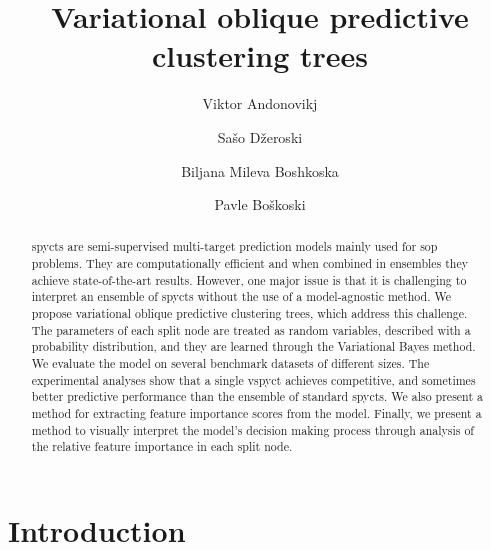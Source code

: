 \documentclass[3p,review,authoryear]{elsarticle}
\begin{document}
\begin{frontmatter}
	\title{Variational oblique predictive clustering trees}
	\author[1,2]{Viktor Andonovikj}
	\author[1]{Sašo Džeroski}
	\author[1,3]{Biljana Mileva Boshkoska}
	\author[1,3]{Pavle Boškoski}
	\address[1]{Jožef Stefan Institute, Jamova cesta 39, 1000 Ljubljana, Slovenia}
	\address[2]{Jožef Stefan International Postgraduate School, Jamova cesta 39, 1000 Ljubljana, Slovenia}
	\address[3]{Faculty of Information Studies in Novo mesto, Ljubljanska cesta 31b, 8000 Novo mesto, Slovenia}
\begin{abstract}

\Glspl{spyct} are semi-supervised multi-target prediction models mainly used for \gls{sop} problems.
They are computationally efficient and when combined in ensembles they achieve state-of-the-art results.
However, one major issue is that it is challenging to interpret an ensemble of \glspl{spyct} without the use of a model-agnostic method.
We propose variational oblique predictive clustering trees, which address this challenge.
The parameters of each split node are treated as random variables, described with a probability distribution, and they are learned through the Variational Bayes method.
We evaluate the model on several benchmark datasets of different sizes.
The experimental analyses show that a single \gls{vspyct} achieves competitive, and sometimes better predictive performance than the ensemble of standard \glspl{spyct}.
We also present a method for extracting feature importance scores from the model.
Finally, we present a method to visually interpret the model's decision making process through analysis of the relative feature importance in each split node.
\end{abstract}
\end{frontmatter}
\glsresetall
	
\section{Introduction}
\end{document}

